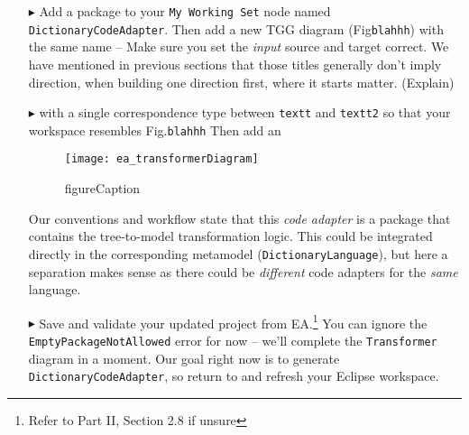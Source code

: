\begin{enumerate}
\newpage

\item[$\blacktriangleright$] Add a package to your \texttt{My Working Set} node named \texttt{DictionaryCodeAdapter}. Then add a new TGG diagram
(Fig\texttt{blahhh}) with the same name -- Make sure you set the \emph{input} source and target correct. We have mentioned in previous sections that those
titles generally don't imply direction, when building one direction first, where it starts matter. (Explain)

\item[$\blacktriangleright$]with a single correspondence type between \texttt{textt} and \texttt{textt2} so that your workspace resembles Fig.\texttt{blahhh}
Then add an

\begin{figure}[htpb]
\begin{center}
  \texttt{[image: ea\_transformerDiagram]}
  \caption{figureCaption}
  \label{ea:newTransformer}
\end{center}
\end{figure}

Our conventions and workflow state that this \emph{code adapter} is a package that contains the tree-to-model transformation logic. This could be integrated
directly in the corresponding metamodel (\texttt{Dic\-tion\-ary\-Language}), but here a separation makes sense as there could be \emph{different} code adapters
for the \emph{same} language.

\item[$\blacktriangleright$] Save and validate your updated project from EA.\footnote{Refer to Part II, Section 2.8 if unsure} You can ignore the
\texttt{EmptyPackageNotAllowed} error for now -- we'll complete the \texttt{Transformer} diagram in a moment. Our goal right now is to generate
\texttt{DictionaryCodeAdapter}, so return to and refresh your Eclipse workspace. 


\end{enumerate}

